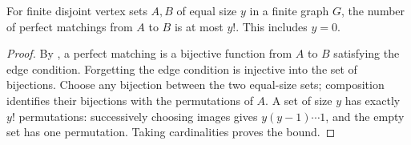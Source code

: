 \begin{lemma}
For finite disjoint vertex sets $A,B$ of equal size $y$ in a finite graph
$G$, the number of perfect matchings from $A$ to $B$ is at most $y!$.
This includes $y=0$.
\end{lemma}
\begin{proof}
By , a perfect matching is a bijective function
from $A$ to $B$ satisfying the edge condition. Forgetting the edge condition
is injective into the set of bijections. Choose any bijection between the
two equal-size sets; composition identifies their bijections with the
permutations of $A$. A set of size $y$ has exactly $y!$ permutations:
successively choosing images gives $y(y-1)\cdots1$, and the empty set
has one permutation. Taking cardinalities proves the bound.
\end{proof}
